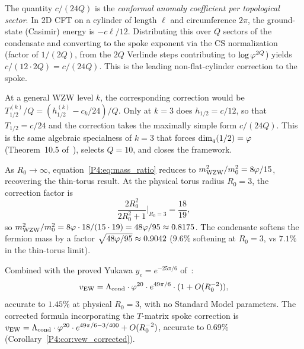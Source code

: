 \begin{remark}
\label{P4:rem:c24Q_interpretation}
The quantity $c/(24Q)$ is the \emph{conformal anomaly coefficient per
topological sector}.  In 2D CFT on a cylinder of length $\ell$ and
circumference $2\pi$, the ground-state (Casimir) energy is $-c\ell/12$.
Distributing this over $Q$ sectors of the condensate and converting to
the spoke exponent via the CS normalization (factor of $1/(2Q)$, from
the $2Q$ Verlinde steps contributing to $\log\varphi^{2Q}$) yields
$c/(12\cdot 2Q) = c/(24Q)$.  This is the leading non-flat-cylinder
correction to the spoke.
\end{remark}

\begin{remark}[Why this identity is $k=3$ specific]
\label{P4:rem:k3_specific}
At a general WZW level $k$, the corresponding correction would be
$T_{1/2}^{(k)}/Q = (h_{1/2}^{(k)}-c_k/24)/Q$.
Only at $k=3$ does $h_{1/2}=c/12$, so that $T_{1/2}=c/24$ and the
correction takes the maximally simple form $c/(24Q)$.
This is the same algebraic specialness of $k=3$ that forces $\dim_q(1/2)=\varphi$
(Theorem~10.5 of~\cite{Paper3}), selects $Q=10$, and closes the framework.
\end{remark}

\begin{corollary}
\label{P4:cor:thin_torus}
As $R_0\to\infty$, equation~\eqref{P4:eq:mass_ratio} reduces to
$m_{\mathrm{WZW}}^2/m_0^2 = 8\varphi/15$, recovering the thin-torus result.
At the physical torus radius $R_0=3$, the correction factor is
\[
  \frac{2R_0^2}{2R_0^2+1}\bigg|_{R_0=3}
  = \frac{18}{19},
\]
so $m_{\mathrm{WZW}}^2/m_0^2 = 8\varphi\cdot18/(15\cdot19) = 48\varphi/95 \approx 0.8175$.
The condensate softens the fermion mass by a factor
$\sqrt{48\varphi/95} \approx 0.9042$
($9.6\%$ softening at $R_0=3$, vs $7.1\%$ in the thin-torus limit).
\end{corollary}

\begin{corollary}
\label{P4:cor:vew}
Combined with the proved Yukawa $y_e = e^{-25\pi/6}$ of~\cite{Paper1}:
\begin{equation}
  v_{\mathrm{EW}} = \Lambda_{\mathrm{cond}}\cdot\varphi^{20}\cdot e^{49\pi/6}\cdot(1+O(R_0^{-2})),
  \label{P4:eq:vew_leading}
\end{equation}
accurate to $1.45\%$ at physical $R_0=3$, with no Standard Model parameters.
The corrected formula incorporating the $T$-matrix spoke correction is
$v_{\mathrm{EW}} = \Lambda_{\mathrm{cond}}\cdot\varphi^{20}\cdot e^{49\pi/6-3/400}+O(R_0^{-2})$,
accurate to $0.69\%$ (Corollary~\ref{P4:cor:vew_corrected}).
\end{corollary}

